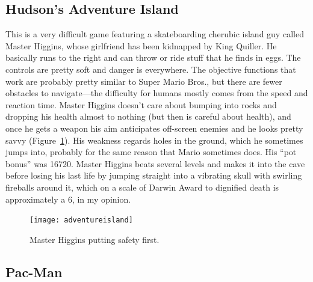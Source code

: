 \documentclass[twocolumn]{article}
\begin{document}
\subsection{Hudson's Adventure Island}

This is a very difficult game featuring a skateboarding cherubic
island guy called Master Higgins, whose girlfriend has been kidnapped
by King Quiller. He basically runs to the right and can throw or ride
stuff that he finds in eggs. The controls are pretty soft and danger
is everywhere. The objective functions that work are probably pretty
similar to Super Mario Bros., but there are fewer obstacles to
navigate---the difficulty for humans mostly comes from the speed and
reaction time. Master Higgins doesn't care about bumping into rocks
and dropping his health almost to nothing (but then is careful about
health), and once he gets a weapon his aim anticipates off-screen
enemies and he looks pretty savvy (Figure~\ref{fig:adventureisland}).
His weakness regards holes in the ground, which he sometimes jumps
into, probably for the same reason that Mario sometimes does. His
``pot bonus'' was 16720. Master Higgins beats several levels and makes
it into the cave before losing his last life by jumping straight into
a vibrating skull with swirling fireballs around it, which on a scale
of Darwin Award to dignified death is approximately a 6, in my
opinion.

\begin{figure}[ht]
\begin{center}
\texttt{[image: adventureisland]}
\end{center}\vspace{-0.1in}
\caption{Master Higgins putting safety first.}
\label{fig:adventureisland}
\end{figure}

\subsection{Pac-Man}
\end{document}
